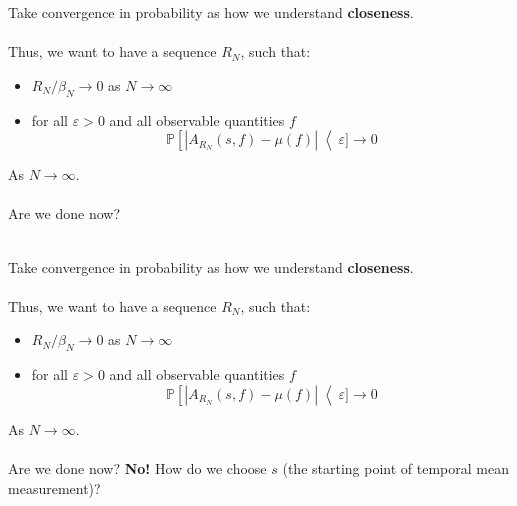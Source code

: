 \documentclass{beamer}
\begin{document}
\begin{frame}
    Take convergence in probability as how we understand \textbf{closeness}. \\~\\
    Thus, we want to have a sequence $R_N$, such that:
    \begin{itemize}
        \item $R_N / \beta_N \rightarrow 0$ as $N \rightarrow \infty$
        \item for all $\varepsilon > 0$ and all observable quantities $f$
        \[
            \mathbb{P}\left[ |A_{R_N}(s, f) - \mu(f)|\right < \varepsilon] \rightarrow 0
        \]
    \end{itemize}

    As $N \rightarrow \infty$. \\~\\
    Are we done now?
    \textcolor{white}{\textbf{No!} How do we choose $s$ (the starting point of temporal mean measurement)?}
\end{frame}

\begin{frame}
    Take convergence in probability as how we understand \textbf{closeness}. \\~\\
    Thus, we want to have a sequence $R_N$, such that:
    \begin{itemize}
        \item $R_N / \beta_N \rightarrow 0$ as $N \rightarrow \infty$
        \item for all $\varepsilon > 0$ and all observable quantities $f$
        \[
            \mathbb{P}\left[ |A_{R_N}(s, f) - \mu(f)|\right < \varepsilon] \rightarrow 0
        \]
    \end{itemize}

    As $N \rightarrow \infty$. \\~\\
    Are we done now?
    \textbf{No!} How do we choose $s$ (the starting point of temporal mean measurement)?
\end{frame}
\end{document}
